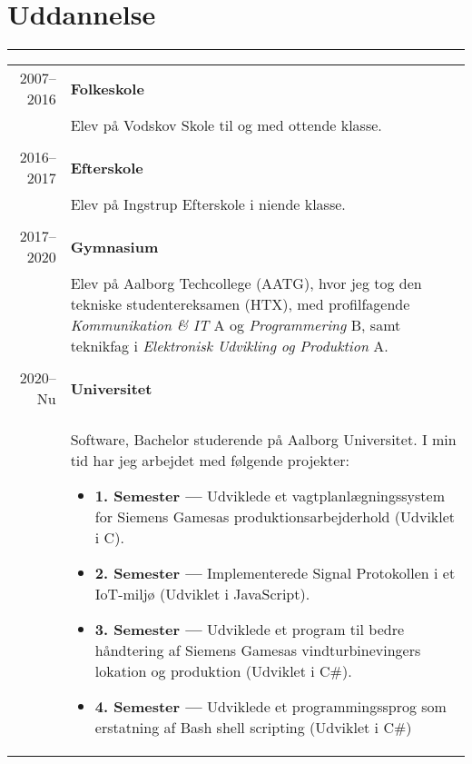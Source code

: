 \documentclass{article}
\begin{document}
\section*{Uddannelse}
\hrule width5cm
\begin{longtabu} to \textwidth {r|X}
2007--2016 & \textbf{Folkeskole}\\
&   Elev på Vodskov Skole til og med ottende klasse.
    \\\\
2016--2017 & \textbf{Efterskole}\\
&   Elev på Ingstrup Efterskole i niende klasse.
    \\\\
2017--2020 & \textbf{Gymnasium}\\
&   Elev på Aalborg Techcollege (AATG), hvor jeg tog den tekniske studentereksamen (HTX),
    med profilfagende \textit{Kommunikation \& IT} A og \textit{Programmering} B, samt teknikfag i \textit{Elektronisk Udvikling og Produktion} A.
    \\\\
2020--Nu & \textbf{Universitet}\\
&   Software, Bachelor studerende på Aalborg Universitet. I min tid har jeg arbejdet
    med følgende projekter:
    \begin{itemize}\setlength\itemsep{0em}
        \item[] \textbf{1. Semester --- } Udviklede et vagtplanlægningssystem for Siemens Gamesas
            produktionsarbejderhold (Udviklet i C).
        \item[] \textbf{2. Semester --- } Implementerede Signal Protokollen i et IoT-miljø
            (Udviklet i JavaScript).
        \item[] \textbf{3. Semester --- } Udviklede et program til bedre håndtering
            af Siemens Gamesas vindturbinevingers lokation og produktion (Udviklet i C\#).
        \item[] \textbf{4. Semester --- } Udviklede et programmingssprog som erstatning
            af Bash shell scripting (Udviklet i C\#)
    \end{itemize}
\end{longtabu}
\end{document}
